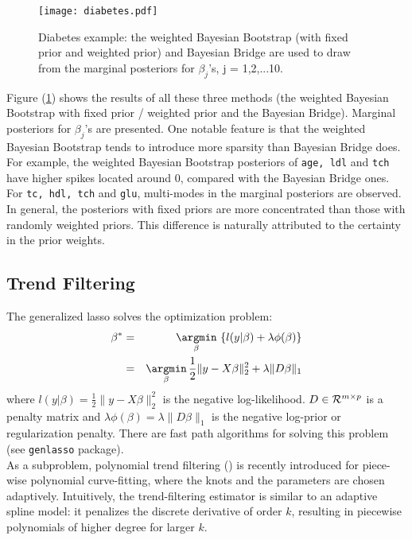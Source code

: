 \documentclass[12pt]{TD-CJS}
\begin{document}
\begin{figure}[!ht]
\centering 
\texttt{[image: diabetes.pdf]} 
\caption{Diabetes example: the weighted Bayesian Bootstrap (with fixed prior and weighted prior) and Bayesian Bridge are used to draw from the marginal posteriors for $\beta_j$'s, j = 1,2,...10. }
\label{diabetes}
\end{figure}


\noindent Figure (\ref{diabetes}) shows the results of all these three methods (the weighted Bayesian Bootstrap with fixed prior / weighted prior and the Bayesian Bridge). Marginal posteriors for $\beta_j$'s are presented. One notable feature is that the weighted Bayesian Bootstrap tends to introduce more sparsity than Bayesian Bridge does. For example, the weighted Bayesian Bootstrap posteriors of {\tt age, ldl} and {\tt tch} have higher spikes located around 0, compared with the Bayesian Bridge ones. For {\tt tc, hdl, tch} and {\tt glu}, multi-modes in the marginal posteriors are observed. In general, the posteriors with fixed priors are more concentrated than those with randomly weighted priors. This difference is naturally attributed to the certainty in the prior weights.


\subsection{Trend Filtering}
The generalized lasso solves the optimization problem:
\begin{eqnarray}
\beta^* &=& \underset{\beta}{\argmin} \, \left\{ l(y|\beta) + \lambda\phi(\beta)  \right\}\\
&=& \underset{\beta}{\argmin} \, \frac{1}{2}\|y - X\beta\|_2^2 + \lambda \|D\beta\|_1
\end{eqnarray}
where $ l(y|\beta) = \frac{1}{2}\|y - X\beta\|_2^2 $ is the negative log-likelihood. $D \in \mathcal{R}^{m\times p}$ is a penalty matrix and $ \lambda\phi(\beta) = \lambda \|D\beta\|_1$ is the negative log-prior or regularization penalty. There are fast path algorithms for solving this problem (see {\tt genlasso} package).\\

\noindent   As a subproblem, polynomial trend filtering (\cite{tibshirani2014adaptive, polson2015mixtures}) is recently introduced for piece-wise polynomial curve-fitting, where the knots and the parameters are chosen adaptively. Intuitively, the trend-filtering estimator is similar to an adaptive spline model: it penalizes the discrete derivative of order $k$, resulting in piecewise polynomials of higher degree for larger $k$.\\
\end{document}
